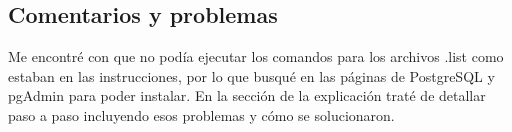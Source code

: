 \documentclass{exam}
\begin{document}
\subsection*{Comentarios y problemas}

Me encontré con que no podía ejecutar los comandos para los archivos .list como estaban en las instrucciones, por lo que busqué en las páginas de PostgreSQL y pgAdmin para poder instalar. En la sección de la explicación traté de detallar paso a paso incluyendo esos problemas y cómo se solucionaron.
\end{document}
